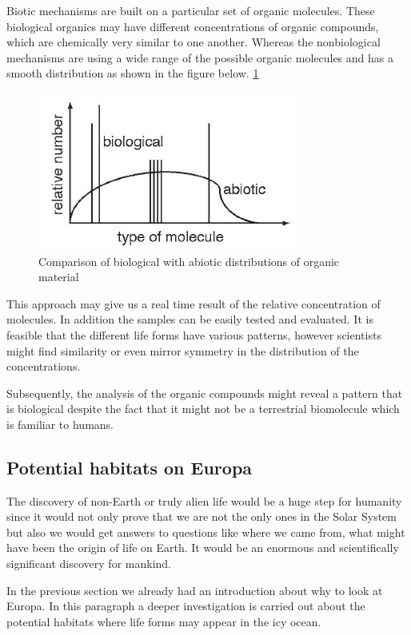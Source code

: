 Biotic mechanisms are built on a particular set of organic molecules. These biological organics may have different concentrations of organic compounds, which are chemically very similar to one another. 
Whereas the nonbiological mechanisms are using a wide range of the possible organic molecules and has a smooth distribution as shown in the figure below.
\ref{fig:biological_vs_abiotic}

\begin{figure}[htb]
  \centering
  \includegraphics[scale=.9]{figures/BFfig/biological_vs_abiotic}
  \caption{Comparison of biological with abiotic distributions of organic material}
  \label{fig:biological_vs_abiotic}
\end{figure}

This approach may give us a real time result of the relative concentration of molecules. In addition the samples can be easily tested and evaluated. 
It is feasible that the different life forms have various patterns, however scientists might find similarity or even mirror symmetry in the distribution of the concentrations. 

Subsequently, the analysis of the organic compounds might reveal a pattern that is biological despite the fact that it might not be a terrestrial biomolecule which is familiar to humans.


\subsection{Potential habitats on Europa}

The discovery of non-Earth or truly alien life would be a huge step for humanity since it would not only prove that we are not the only ones in the Solar System but also we would get answers to questions like where we came from, what might have been the origin of life on Earth. It would be an enormous and scientifically significant discovery for mankind.

In the previous section we already had an introduction about why to look at Europa. In this paragraph a deeper investigation is carried out about the potential habitats where life forms may appear in the icy ocean.

